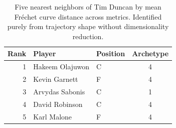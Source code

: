 \begin{table}[htbp]
  \centering\small
  \begin{tabular}{rllc}
    \toprule
    Rank & Player & Position & Archetype \\
    \midrule
    1 & Hakeem Olajuwon & C & 4 \\
    2 & Kevin Garnett & F & 4 \\
    3 & Arvydas Sabonis & C & 1 \\
    4 & David Robinson & C & 4 \\
    5 & Karl Malone & F & 4 \\
    \bottomrule
  \end{tabular}
  \caption{Five nearest neighbors of Tim Duncan by mean Fr\'{e}chet curve distance across metrics. Identified purely from trajectory shape without dimensionality reduction.}
  \label{tab:Tim_Duncan_frechet_curve_neighbors}
\end{table}

